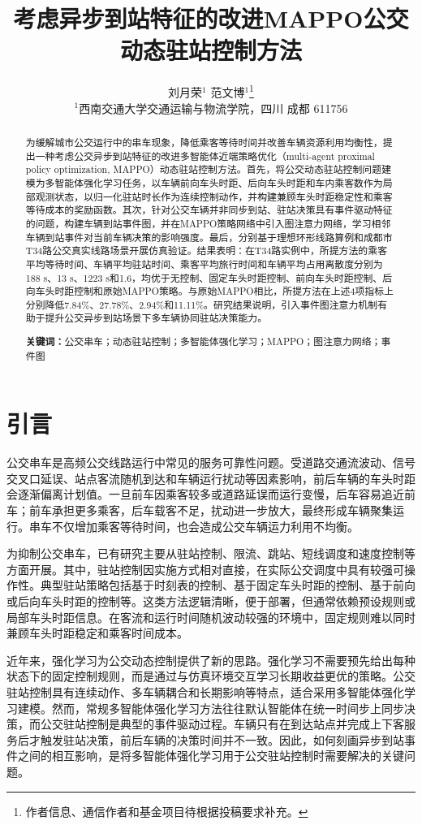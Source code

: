 \documentclass[UTF8,zihao=-4,fontset=none]{ctexart}
\title{\heiti 考虑异步到站特征的改进MAPPO公交动态驻站控制方法}
\author{
刘月荣$^{1}$ \quad 范文博$^{1}$\thanks{作者信息、通信作者和基金项目待根据投稿要求补充。}\\
\small $^{1}$西南交通大学交通运输与物流学院，四川 成都 611756
}
\date{}
\begin{document}
\maketitle

\begin{abstract}
为缓解城市公交运行中的串车现象，降低乘客等待时间并改善车辆资源利用均衡性，提出一种考虑公交异步到站特征的改进多智能体近端策略优化（multi-agent proximal policy optimization, MAPPO）动态驻站控制方法。首先，将公交动态驻站控制问题建模为多智能体强化学习任务，以车辆前向车头时距、后向车头时距和车内乘客数作为局部观测状态，以归一化驻站时长作为连续控制动作，并构建兼顾车头时距稳定性和乘客等待成本的奖励函数。其次，针对公交车辆并非同步到站、驻站决策具有事件驱动特征的问题，构建车辆到站事件图，并在MAPPO策略网络中引入图注意力网络，学习相邻车辆到站事件对当前车辆决策的影响强度。最后，分别基于理想环形线路算例和成都市T34路公交真实线路场景开展仿真验证。结果表明：在T34路实例中，所提方法的乘客平均等待时间、车辆平均驻站时间、乘客平均旅行时间和车辆平均占用离散度分别为188 s、13 s、1223 s和1.6，均优于无控制、固定车头时距控制、前向车头时距控制、后向车头时距控制和原始MAPPO策略。与原始MAPPO相比，所提方法在上述4项指标上分别降低7.84\%、27.78\%、2.94\%和11.11\%。研究结果说明，引入事件图注意力机制有助于提升公交异步到站场景下多车辆协同驻站决策能力。

\textbf{关键词：}公交串车；动态驻站控制；多智能体强化学习；MAPPO；图注意力网络；事件图
\end{abstract}

\section{引言}

公交串车是高频公交线路运行中常见的服务可靠性问题。受道路交通流波动、信号交叉口延误、站点客流随机到达和车辆运行扰动等因素影响，前后车辆的车头时距会逐渐偏离计划值。一旦前车因乘客较多或道路延误而运行变慢，后车容易追近前车；前车承担更多乘客，后车载客不足，扰动进一步放大，最终形成车辆聚集运行。串车不仅增加乘客等待时间，也会造成公交车辆运力利用不均衡。

为抑制公交串车，已有研究主要从驻站控制、限流、跳站、短线调度和速度控制等方面开展。其中，驻站控制因实施方式相对直接，在实际公交调度中具有较强可操作性。典型驻站策略包括基于时刻表的控制、基于固定车头时距的控制、基于前向或后向车头时距的控制等。这类方法逻辑清晰，便于部署，但通常依赖预设规则或局部车头时距信息。在客流和运行时间随机波动较强的环境中，固定规则难以同时兼顾车头时距稳定和乘客时间成本。

近年来，强化学习为公交动态控制提供了新的思路。强化学习不需要预先给出每种状态下的固定控制规则，而是通过与仿真环境交互学习长期收益更优的策略。公交驻站控制具有连续动作、多车辆耦合和长期影响等特点，适合采用多智能体强化学习建模。然而，常规多智能体强化学习方法往往默认智能体在统一时间步上同步决策，而公交驻站控制是典型的事件驱动过程。车辆只有在到达站点并完成上下客服务后才触发驻站决策，前后车辆的决策时间并不一致。因此，如何刻画异步到站事件之间的相互影响，是将多智能体强化学习用于公交驻站控制时需要解决的关键问题。
\end{document}
